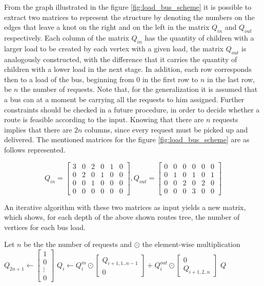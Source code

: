 \documentclass[tuberlin,cic,tc,openright,english,noabntcite]{iiufrgs}
\begin{document}
From the graph illustrated in the figure \ref{fig:load_bus_scheme} it is possible to extract two matrices to represent the structure by denoting the numbers on the edges that leave a knot on the right and on the left in the matrix $Q_{in}$ and $Q_{out}$ respectively. Each column of the matrix $Q_{in}$ has the quantity of children with a larger load to be created by each vertex with a given load, the matrix $Q_{out}$ is analogously constructed, with the difference that it carries the quantity of children with a lower load in the next stage. In addition, each row corresponds then to a load of the bus, beginning from $0$ in the first row to $n$ in the last row, be $n$ the number of requests. Note that, for the generalization it is assumed that a bus can at a moment be carrying all the requests to him assigned. Further constraints should be checked in a future procedure, in order to decide whether a route is feasible according to the input. Knowing that there are $n$ requests implies that there are $2n$ columns, since every request must be picked up and delivered. The mentioned matrices for the figure \ref{fig:load_bus_scheme} are as follows represented.

$$
Q_{in} = 
\begin{bmatrix}
3 & 0 & 2 & 0 & 1 & 0\\
0 & 2 & 0 & 1 & 0 & 0\\
0 & 0 & 1 & 0 & 0 & 0\\
0 & 0 & 0 & 0 & 0 & 0
\end{bmatrix}
,
Q_{out} = 
\begin{bmatrix}
0 & 0 & 0 & 0 & 0 & 0\\
0 & 1 & 0 & 1 & 0 & 1\\
0 & 0 & 2 & 0 & 2 & 0\\
0 & 0 & 0 & 3 & 0 & 0
\end{bmatrix}
$$

An iterative algorithm with these two matrices as input yields a new matrix, which shows, for each depth of the above shown routes tree, the number of vertices for each bus load.

\begin{algorithmic}
\State Let $n$ be the the number of requests and $\odot$ the element-wise multiplication
\State $\displaystyle Q_{2n+1} \gets \begin{bmatrix}1\\ 0 \\ \vdots \\0 \end{bmatrix}$
	\State $\displaystyle Q_{i} \gets Q^{in}_{i} \odot \begin{bmatrix}Q_{i+1,1..n-1} \\ 0\end{bmatrix}
	+ Q^{out}_{i} \odot \begin{bmatrix}0\\ Q_{i+1,2..n}\end{bmatrix}$
\EndFor
\State \Return $Q$
\EndFunction
\end{algorithmic}
\end{document}
